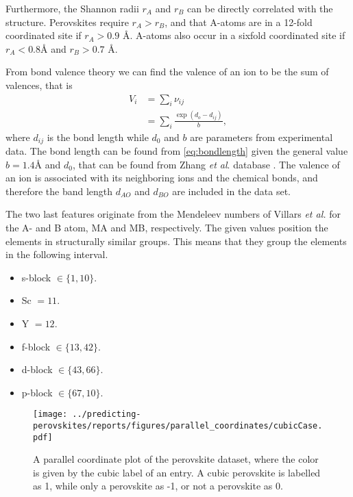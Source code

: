 Furthermore, the Shannon radii $r_A$ and $r_B$ can be directly correlated with the structure. Perovskites require $r_A > r_B$, and that A-atoms are in a 12-fold coordinated site if $r_A > 0.9$ $\text{\AA}$. A-atoms also occur in a sixfold coordinated site if $r_A < 0.8\text{\AA}$ and $r_B >0.7$ $\text{\AA}$.

From bond valence theory we can find the valence of an ion to be the sum of valences, that is
\begin{align}
  V_i &= \sum_i \nu_{ij} \\
  &= \sum_i \frac{\exp(d_o - d_{ij})}{b} \label{eq:bondlength},
\end{align}
where $d_{ij}$ is the bond length while $d_0$ and $b$ are parameters from experimental data. The bond length can be found from \autoref{eq:bondlength} given the general value $b=1.4\text{\AA}$ and $d_0$, that can be found from Zhang \textit{et al}. database \cite{Zhang2007}. The valence of an ion is associated with its neighboring ions and the chemical bonds, and therefore the band length $d_{AO}$ and $d_{BO}$ are included in the data set.

The two last features originate from the Mendeleev numbers of Villars \textit{et al.} \cite{Villars2004} for the A- and B atom, MA and MB, respectively. The given values position the elements in structurally similar groups. This means that they group the elements in the following interval.

\begin{itemize}
  \item s-block $\in \{1,10\}$.
  \item Sc $ = 11$.
  \item Y  $ = 12$.
  \item f-block $\in \{13,42\}$.
  \item d-block $\in \{43,66\}$.
  \item p-block $\in \{67,10\}$.
\end{itemize}

\begin{figure}[ht!]
  \centering
  \texttt{[image: ../predicting-perovskites/reports/figures/parallel\_coordinates/cubicCase.pdf]}
  \vspace*{-130mm}
  \caption{A parallel coordinate plot of the perovskite dataset, where the color is given by the cubic label of an entry. A cubic perovskite is labelled as 1, while only a perovskite as -1, or not a perovskite as 0.}
  \label{fig:plcp}
\end{figure}

